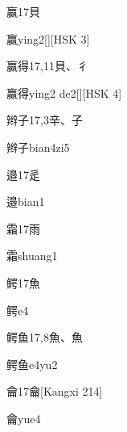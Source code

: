 \begin{entry}{赢}{17}{⾙}
  \begin{phonetics}{赢}{ying2}[][HSK 3]
  \end{phonetics}
\end{entry}

\begin{entry}{赢得}{17,11}{⾙、⼻}
  \begin{phonetics}{赢得}{ying2 de2}[][HSK 4]
  \end{phonetics}
\end{entry}

\begin{entry}{辫子}{17,3}{⾟、⼦}
  \begin{phonetics}{辫子}{bian4zi5}
  \end{phonetics}
\end{entry}

\begin{entry}{邉}{17}{⾡}
  \begin{phonetics}{邉}{bian1}
  \end{phonetics}
\end{entry}

\begin{entry}{霜}{17}{⾬}
  \begin{phonetics}{霜}{shuang1}
  \end{phonetics}
\end{entry}

\begin{entry}{鳄}{17}{⿂}
  \begin{phonetics}{鳄}{e4}
  \end{phonetics}
\end{entry}

\begin{entry}{鳄鱼}{17,8}{⿂、⿂}
  \begin{phonetics}{鳄鱼}{e4yu2}
  \end{phonetics}
\end{entry}

\begin{entry}{龠}{17}{⿕}[Kangxi 214]
  \begin{phonetics}{龠}{yue4}
  \end{phonetics}
\end{entry}


